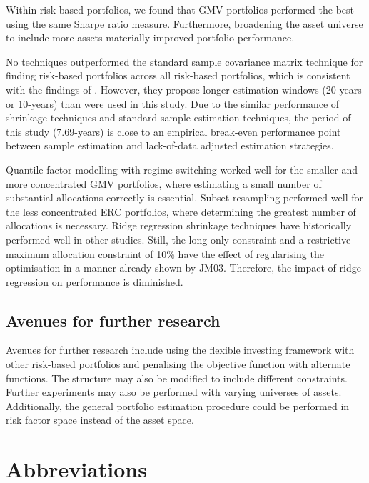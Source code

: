 \documentclass[
]{article}
\begin{document}
Within risk-based portfolios, we found that GMV portfolios performed the best using the same Sharpe ratio
measure. Furthermore, broadening the asset universe to include more assets materially improved portfolio
performance.

No techniques outperformed the standard sample covariance matrix technique for finding risk-based
portfolios across all risk-based portfolios, which is consistent with the findings of \citet{K10}. However,
they propose longer estimation windows (20-years or 10-years) than were used in this study. Due to the
similar performance of shrinkage techniques and standard sample estimation techniques, the period of this
study (7.69-years) is close to an empirical break-even performance point between sample estimation and
lack-of-data adjusted estimation strategies.

Quantile factor modelling with regime switching worked well for the smaller and more concentrated GMV
portfolios, where estimating a small number of substantial allocations correctly is essential. Subset
resampling performed well for the less concentrated ERC portfolios, where determining the greatest number
of allocations is necessary. Ridge regression shrinkage techniques have historically performed well in
other studies. Still, the long-only constraint and a restrictive maximum allocation constraint of 10\%
have the effect of regularising the optimisation in a manner already shown by JM03. Therefore, the
impact of ridge regression on performance is diminished.

\hypertarget{avenues-for-further-research}{%
\subsection{Avenues for further research}\label{avenues-for-further-research}}

Avenues for further research include using the flexible investing framework with other risk-based
portfolios and penalising the objective function with alternate functions. The structure may also be
modified to include different constraints. Further experiments may also be performed with varying
universes of assets. Additionally, the general portfolio estimation procedure could be performed in
risk factor space instead of the asset space.

\hypertarget{appendix-appendix}{%
\appendix}


\hypertarget{abbreviations}{%
\section{Abbreviations}\label{abbreviations}}
\end{document}
